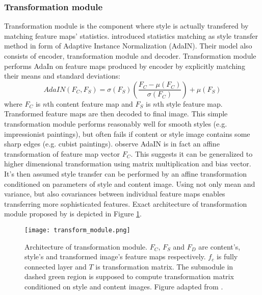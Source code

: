 \documentclass[../Main.tex]{subfiles}
\begin{document}
    \subsubsection{Transformation module} \label{transformation_module}
    Transformation module is the component where style is actually transfered
    by matching feature maps' statistics. \cite{huang2017adain} introduced
    statistics matching as style transfer method in form of Adaptive Instance
    Normalization (AdaIN). Their model also consists of encoder, transformation
    module and decoder. Transformation module performs AdaIn on feature maps
    produced by encoder by explicitly matching their means and standard deviations:
    \[ AdaIN(F_C, F_S) = \sigma(F_S)\left( \frac{F_C - \mu(F_C)}{\sigma(F_C)}\right)+\mu(F_S) \]
    where $F_C$ is $n$th content feature map and $F_S$ is $n$th style feature map.
    Transformed feature maps are then decoded to final image. This simple transformation 
    module performs reasonably well for smooth styles (e.g. impressionist paintings),
    but often fails if content or style image contains some sharp edges 
    (e.g. cubist paintings). \cite{Li2018} observe
    AdaIN is in fact an affine transformation of feature map vector $F_C$. 
    This suggests it can be generalized to higher dimensional transformation 
    using matrix multiplication and bias vector. It's then assumed style transfer
    can be performed by an affine transformation conditioned on parameters 
    of style and content image. Using not only mean and variance, but also 
    covariances between individual feature maps enables transferring 
    more sophisticated features. Exact architecture of
    transformation module proposed by \cite{Li2018} is depicted in Figure
    \ref{fig:transform_module}. 
    
        \begin{figure}[ht!]
        \centering
            \texttt{[image: transform\_module.png]}
            \caption{Architecture of transformation module. $F_C$, $F_S$ and $F_D$
            are content's, style's and transformed image's feature maps respectively.
            $f_c$ is fully connected layer and $T$ is transformation matrix. 
            The submodule in dashed green region is supposed to compute 
            transformation matrix conditioned on style and content images.
            Figure adapted from \cite{Li2018}.
            }
            \label{fig:transform_module}
        \end{figure}
        
\end{document}
